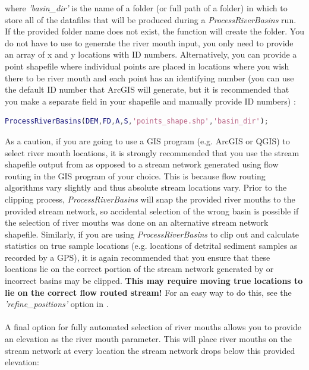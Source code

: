 \noindent
where \textit{'basin\_dir'} is the name of a folder (or full path of a folder) in which to store all of the datafiles that will be produced during a \textit{ProcessRiverBasins} run. If the provided folder name does not exist, the function will create the folder. You do not have to use  to generate the river mouth input, you only need to provide an array of x and y locations with ID numbers. Alternatively, you can provide a point shapefile where individual points are placed in locations where you wish there to be river mouth and each point has an identifying number (you can use the default ID number that ArcGIS will generate, but it is recommended that you make a separate field in your shapefile and manually provide ID numbers) :

\begin{lstlisting}[language=Matlab]
% Using a point shapefile to run ProcessRiverBasins
ProcessRiverBasins(DEM,FD,A,S,'points_shape.shp','basin_dir');
\end{lstlisting}

\noindent
As a caution, if you are going to use a GIS program (e.g. ArcGIS or QGIS) to select river mouth locations, it is strongly recommended that you use the stream shapefile output from  as opposed to a stream network generated using flow routing in the GIS program of your choice. This is because flow routing algorithms vary slightly and thus  absolute stream locations vary. Prior to the clipping process, \textit{ProcessRiverBasins} will snap the provided river mouths to the provided stream network, so accidental selection of the wrong basin is possible if the selection of river mouths was done on an alternative stream network shapefile. Similarly, if you are using \textit{ProcessRiverBasins} to clip out and calculate statistics on true sample locations (e.g. locations of detrital sediment samples as recorded by a GPS), it is again recommended that you ensure that these locations lie on the correct portion of the stream network generated by  or incorrect basins may be clipped. \textbf{This may require moving true locations to lie on the correct flow routed stream!} For an easy way to do this, see the \textit{'refine\_positions'} option in .

\paragraph{}A final option for fully automated selection of river mouths allows you to provide an elevation as the river mouth parameter. This will place river mouths on the stream network at every location the stream network drops below this provided elevation:

